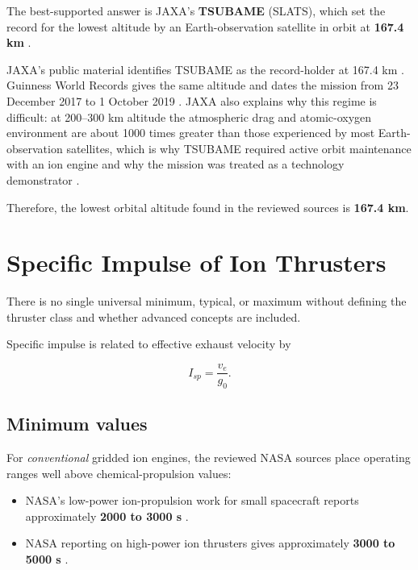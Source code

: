 \documentclass[11pt]{article}
\begin{document}
The best-supported answer is JAXA's \textbf{TSUBAME} (SLATS), which set the record for the lowest altitude by an Earth-observation satellite in orbit at \textbf{167.4 km} \cite{jaxavariety,tsubamegwr}.

JAXA's public material identifies TSUBAME as the record-holder at 167.4 km \cite{jaxavariety}. Guinness World Records gives the same altitude and dates the mission from 23 December 2017 to 1 October 2019 \cite{tsubamegwr}. JAXA also explains why this regime is difficult: at 200--300 km altitude the atmospheric drag and atomic-oxygen environment are about 1000 times greater than those experienced by most Earth-observation satellites, which is why TSUBAME required active orbit maintenance with an ion engine and why the mission was treated as a technology demonstrator \cite{jaxaterminate}.

Therefore, the lowest orbital altitude found in the reviewed sources is \textbf{167.4 km}. 

\section{Specific Impulse of Ion Thrusters}

There is no single universal minimum, typical, or maximum without defining the thruster class and whether advanced concepts are included.

Specific impulse is related to effective exhaust velocity by

\begin{equation}
I_{sp} = \frac{v_e}{g_0}.
\end{equation}

\subsection{Minimum values}

For \emph{conventional} gridded ion engines, the reviewed NASA sources place operating ranges well above chemical-propulsion values:

\begin{itemize}
    \item NASA's low-power ion-propulsion work for small spacecraft reports approximately \textbf{2000 to 3000 s} \cite{nasalowpower}.
    \item NASA reporting on high-power ion thrusters gives approximately \textbf{3000 to 5000 s} \cite{nasahighpower}.
\end{itemize}
\end{document}
